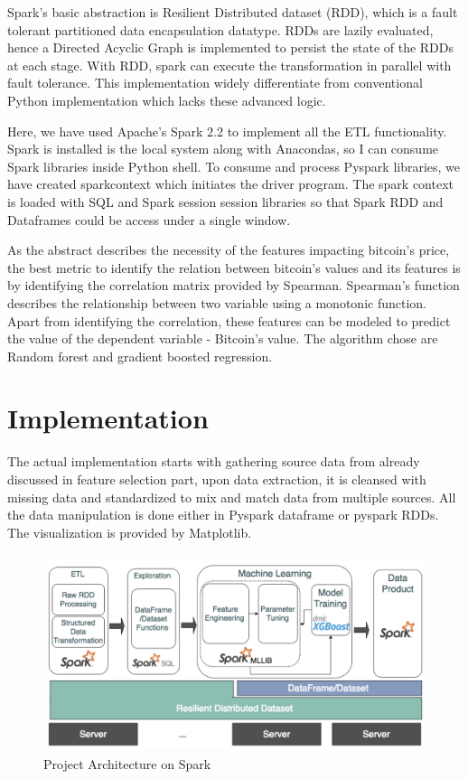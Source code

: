 \documentclass[sigconf]{acmart}
\begin{document}
Spark's basic abstraction is Resilient Distributed dataset (RDD), which is a fault tolerant partitioned data encapsulation datatype. RDDs are lazily evaluated, hence a Directed Acyclic Graph is implemented to persist the state of the RDDs at each stage. With RDD, spark can execute the transformation in parallel with fault tolerance. This implementation widely differentiate from conventional Python implementation which lacks these advanced logic.  

Here, we have used Apache's Spark 2.2 to implement all the ETL functionality. Spark is installed is the local system along with Anacondas, so I can consume Spark libraries inside Python shell. To consume and process Pyspark libraries, we have created sparkcontext which initiates the driver program. The spark context is loaded with SQL and Spark session session libraries so that Spark RDD and Dataframes could be access under a single window.

As the abstract describes the necessity of the features impacting bitcoin's price, the best metric to identify the relation between bitcoin's values and its features is by identifying the correlation matrix provided by Spearman. Spearman's function describes the relationship between two variable using a monotonic function. Apart from identifying the correlation, these features can be modeled to predict the value of the dependent variable - Bitcoin's value. The algorithm chose are Random forest and gradient boosted regression.

\section{Implementation}
The actual implementation starts with gathering source data from already discussed in feature selection part, upon data extraction, it is cleansed with missing data and standardized to mix and match data from multiple sources. All the data manipulation is done either in Pyspark dataframe or pyspark RDDs. The visualization is provided by Matplotlib.

\begin{figure}[!ht]
  \centering\includegraphics[width=\columnwidth]{PROJECT/images/Projectflow.png}
  \caption{Project Architecture on Spark}
  \label{Architecture:spark}
\end{figure}
\end{document}
